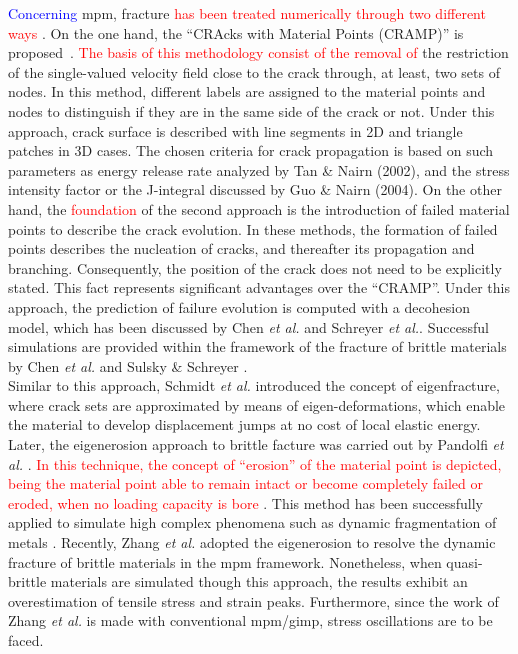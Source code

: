 \message{ !name(2020_EFM_MPM_Eigensoftening.tex)}\documentclass[preprint,12pt,a4paper]{elsarticle}
\newcommand{\PNA}[1]{
  \textcolor{red}{{#1}}
}
\newcommand{\MMP}[1]{
  \textcolor{blue}{{#1}}
}
\begin{document}
\MMP{Concerning} \acrshort{mpm}, fracture \PNA{has been treated numerically through two different ways}. On the one hand, the ``CRAcks with Material Points (CRAMP)'' is proposed~\cite{Nairn_2003,Nairn_2006}. \PNA{The basis of this methodology consist of the removal of} the restriction
of the single-valued velocity field close to the crack through, at least, two sets of nodes. In this method, different labels are assigned to the material points
and nodes to distinguish if they are in the same side of the crack or
not. Under this approach, crack surface is described with line segments
in 2D and triangle patches in 3D cases. The chosen criteria for crack
propagation is based on such parameters as energy release rate
analyzed by Tan \& Nairn (2002)\cite{Nairn_2002}, and the stress
intensity factor or the J-integral discussed by Guo \& Nairn
(2004)\cite{Nairn_2004}. 
On the other hand, the \PNA{foundation} of the second approach is the introduction of failed
material points to describe the crack evolution. In these methods, the
formation of failed points describes the nucleation of cracks, and
thereafter its propagation and branching. Consequently, the position
of the crack does not need to be explicitly stated. This fact represents
significant advantages over the ``CRAMP''. Under this approach, the
prediction of failure evolution is computed with a decohesion model,
which has been discussed by Chen {\it et al.}\cite{Zhenmao_2005} and
Schreyer {\it et al.}\cite{Schreyer_2002}. Successful simulations are provided within the framework of the fracture of brittle materials by Chen {\it et
  al.} \cite{Chen_2002,Chen_2003} and Sulsky \& Schreyer
\cite{Sulsky_2004}.\\

Similar to this approach, Schmidt {\it et al.}
\cite{Schmidt_2009} introduced the concept of eigenfracture, where
crack sets are approximated by means of eigen-deformations, which
enable the material to develop displacement jumps at no cost of local
elastic energy. Later, the eigenerosion approach to brittle facture
was carried out by Pandolfi {\it et al.}
\cite{Pandolfi_2012,Pandolfi_2013}. \PNA{In this technique, the concept of ``erosion'' of
the material point is depicted, being the material point able to remain intact or become completely failed or eroded, when no loading
capacity is bore}. This method has been successfully applied to simulate high
complex phenomena such as dynamic fragmentation of metals
\cite{Li_2015}. Recently, Zhang {\it et al.}
\cite{Zhang_EE_2020} adopted the eigenerosion to resolve the dynamic
fracture of brittle materials in the \acrshort{mpm}
framework. Nonetheless, when quasi-brittle materials are simulated
though this approach, the results exhibit an overestimation of tensile
stress and strain peaks. Furthermore, since the work of Zhang {\it et al.}
\cite{Zhang_EE_2020} is made with conventional \acrshort{mpm}/\acrshort{gimp}, stress oscillations are to be faced.\\
\end{document}
